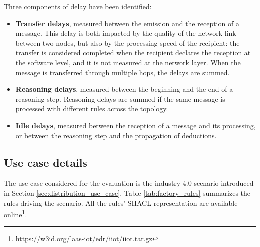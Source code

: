 \documentclass{iosart2c}
\begin{document}
Three components of delay have been identified:
\begin{itemize}
	\item \textbf{Transfer delays}, measured between the emission and the reception of a message. This delay is both impacted by the quality of the network link between two nodes, but also by the processing speed of the recipient: the transfer is considered completed when the recipient declares the reception at the software level, and it is not measured at the network layer. 
	When the message is transferred through multiple hops, the delays are summed.
	\item \textbf{Reasoning delays}, measured between the beginning and the end of a reasoning step. 
	Reasoning delays are summed if the same message is processed with different rules across the topology.
	\item \textbf{Idle delays}, measured between the reception of a message and its processing, or between the reasoning step and the propagation of deductions.
\end{itemize}

\subsection{Use case details}
\label{subs:factory_use_case}

The use case considered for the evaluation is the industry 4.0 scenario introduced in Section \textsection \ref{sec:distribution_use_case}.
Table \ref{tab:factory_rules} summarizes the rules driving the scenario. 
All the rules' SHACL representation are available online\footnote{\url{https://w3id.org/laas-iot/edr/iiot/iiot.tar.gz}}.
\end{document}
